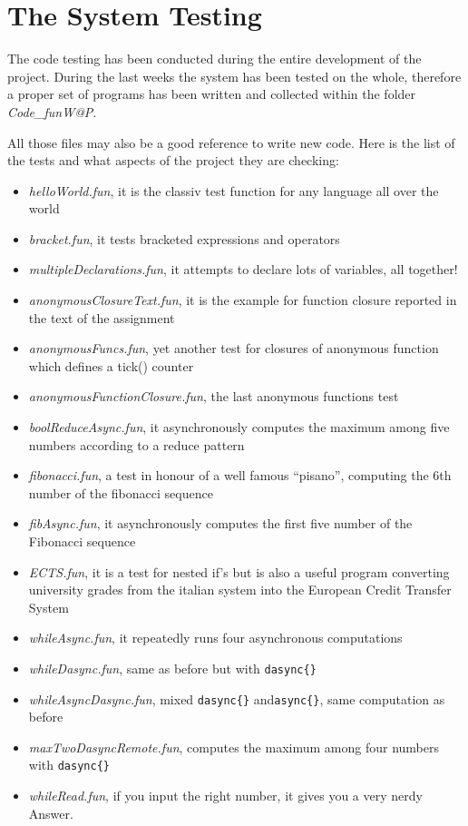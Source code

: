 \chapter{\label{chapter6} The System Testing}

The code testing has been conducted during the entire development of the project. During the last weeks the system has been tested on the whole, therefore a proper set of \fwap programs has been written and collected within the folder \textsl{Code_funW@P}. 

All those files may also be a good reference to write new \fwap code. Here is the list of the tests and what aspects of the project they are checking:

\begin{itemize}
\item \textit{helloWorld.fun}, it is the classiv test function for any language all over the world
\item \textit{bracket.fun}, it tests bracketed expressions and operators
\item \textit{multipleDeclarations.fun}, it attempts to declare lots of variables, all together!
\item \textit{anonymousClosureText.fun}, it is the example for function closure reported in the text of the assignment \cite{exercise}
\item \textit{anonymousFuncs.fun}, yet another test for closures of anonymous function which defines a tick() counter
\item \textit{anonymousFunctionClosure.fun}, the last anonymous functions test
\item \textit{boolReduceAsync.fun}, it asynchronously computes the maximum among five numbers according to a reduce pattern
\item \textit{fibonacci.fun}, a test in honour of a well famous "`pisano"', computing the 6th number of the fibonacci sequence
\item \textit{fibAsync.fun}, it asynchronously computes the first five number of the Fibonacci sequence
\item \textit{ECTS.fun}, it is a test for nested if's but is also a useful program converting university grades from the italian system into the European Credit Transfer System \cite{ects}
\item \textit{whileAsync.fun}, it repeatedly runs four asynchronous computations
\item \textit{whileDasync.fun}, same as before but with \texttt{dasync\{\}}
\item \textit{whileAsyncDasync.fun}, mixed \texttt{dasync\{\}} and\texttt{async\{\}}, same computation as before
\item \textit{maxTwoDasyncRemote.fun}, computes the maximum among four numbers with \texttt{dasync\{\}}
\item \textit{whileRead.fun}, if you input the right number, it gives you a very nerdy Answer.
\end{itemize}
